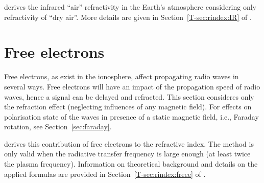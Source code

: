  derives the infrared ``air'' refractivity in the
Earth's atmosphere considering only refractivity of ``dry air''. More details
are given in Section~\ref{T-sec:rindex:IR} of \theory.

\section{Free electrons}
 \label{sec:rindex:freee}
%
Free electrons, as exist in the ionosphere, affect propagating radio waves
in several ways. Free electrons will have an impact of the propagation speed of
radio waves, hence a signal can be delayed and refracted. This section
consideres only the refraction effect (neglecting influences of any magnetic
field). For effects on polarisation state of the
waves in presence of a static magnetic field, i.e., Faraday rotation, see
Section~\ref{sec:faraday}.

 derives this contribution of free
electrons to the refractive index. The method is only valid when the radiative
transfer frequency is large enough (at least twice the plasma frequency).
Information on theoretical background and details on the applied formulas are
provided in Section~\ref{T-sec:rindex:freee} of \theory.


